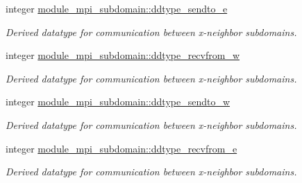 \textbf{ }\par
\begin{DoxyCompactItemize}
\item 
integer \mbox{\hyperlink{namespacemodule__mpi__subdomain_a17fa32eaf9dfe52b13cc7f17572a63be}{module\+\_\+mpi\+\_\+subdomain\+::ddtype\+\_\+sendto\+\_\+e}}
\begin{DoxyCompactList}\small\item\em Derived datatype for communication between x-\/neighbor subdomains. \end{DoxyCompactList}\item 
integer \mbox{\hyperlink{namespacemodule__mpi__subdomain_a8422fcfc17adb1bdf04f2b7ca08003c2}{module\+\_\+mpi\+\_\+subdomain\+::ddtype\+\_\+recvfrom\+\_\+w}}
\begin{DoxyCompactList}\small\item\em Derived datatype for communication between x-\/neighbor subdomains. \end{DoxyCompactList}\item 
integer \mbox{\hyperlink{namespacemodule__mpi__subdomain_a9ca276bc5dcbfd8fcb5b8173e66dba07}{module\+\_\+mpi\+\_\+subdomain\+::ddtype\+\_\+sendto\+\_\+w}}
\begin{DoxyCompactList}\small\item\em Derived datatype for communication between x-\/neighbor subdomains. \end{DoxyCompactList}\item 
integer \mbox{\hyperlink{namespacemodule__mpi__subdomain_ab6299920e9e9fe15e9936e4be0bcfe7a}{module\+\_\+mpi\+\_\+subdomain\+::ddtype\+\_\+recvfrom\+\_\+e}}
\begin{DoxyCompactList}\small\item\em Derived datatype for communication between x-\/neighbor subdomains. \end{DoxyCompactList}\end{DoxyCompactItemize}

